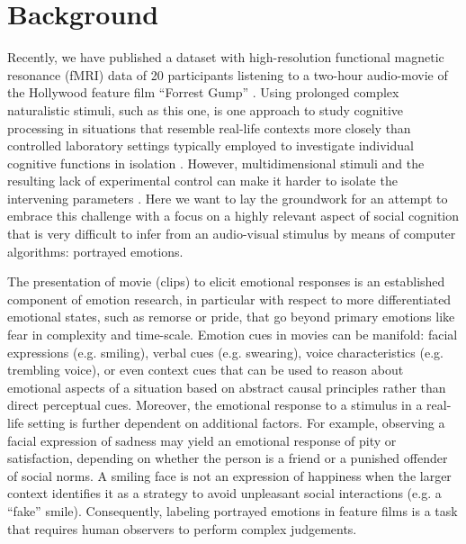 \section*{Background} 


Recently, we have published a dataset with high-resolution functional magnetic
resonance (fMRI) data of 20 participants listening to a two-hour audio-movie of
the Hollywood feature film ``Forrest Gump'' \cite{HBI+14}. Using prolonged
complex naturalistic stimuli, such as this one, is one approach to study
cognitive processing in situations that resemble real-life contexts more
closely than controlled laboratory settings typically employed to investigate
individual cognitive functions in isolation \cite{HH2012}. However,
multidimensional stimuli and the resulting lack of experimental control can
make it harder to isolate the intervening parameters \cite{HH2012}. Here we
want to lay the groundwork for an attempt to embrace this challenge with a
focus on a highly relevant aspect of social cognition that is
very difficult to infer from an audio-visual stimulus by means of computer
algorithms: portrayed emotions.

The presentation of movie (clips) to elicit emotional responses is an
established component of emotion research, in particular with respect to more
differentiated emotional states, such as remorse or pride, that go beyond
primary emotions like fear in complexity and time-scale\cite{GL1995}. Emotion
cues in movies can be manifold: facial expressions (e.g.
smiling)\cite{Ekm1992b}, verbal cues (e.g. swearing), voice characteristics
(e.g. trembling voice)\cite{EVS+2009}, or even context cues that can be used to
reason about emotional aspects of a situation based on abstract causal
principles rather than direct perceptual cues\cite{SS2014}.  Moreover, the
emotional response to a stimulus in a real-life setting is further dependent on
additional factors. For example, observing a facial expression of sadness may
yield an emotional response of pity or satisfaction, depending on whether the
person is a friend or a punished offender of social norms. A smiling face is
not an expression of happiness when the larger context identifies it as a
strategy to avoid unpleasant social interactions (e.g. a ``fake'' smile).
Consequently, labeling portrayed emotions in feature films is a task that
requires human observers to perform complex judgements.

